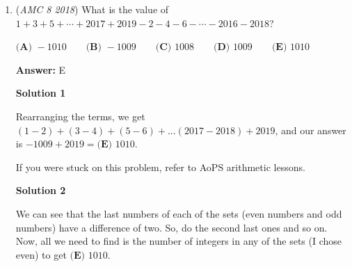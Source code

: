 \begin{enumerate}
 \textbf{Answer: }C



\textbf{Solution 1}

We count $3 \cdot 3=9$ unit squares in the middle, and $8$ small triangles, which gives 4 rectangles each with an area of $1$. Thus, the answer is $9+4=\boxed{\textbf{(C) } 13}$.

 



\textbf{Solution 2}

We can see here that there are $9$ total squares in the middle. We also see that the triangles that make the corners of the shape have an area half the squares' area. Then, we can easily find that each corner has an area of one square and there are $4$ corners so we add that to the original 9 squares to get $9+4=\boxed{\textbf{(C) } 13}$. That is how I did it. 

 



\textbf{Solution 3}

We can apply Pick's Theorem here. There are $8$ lattice points, and $12$ lattice points on the boundary. Then,

 
 \[8 + 12 \div 2 - 1 = \boxed {\textbf{(C) }13}.\]




\textbf{Solution 4}

Use the \href{https://artofproblemsolving.com/wiki/index.php?title=Shoelace\_Theorem}{Shoelace Theorem} and get $\boxed{\textbf{(C) } 13}$.

 


	\item (\textit{AMC 8 2018}) What is the value of $1+3+5+\cdots+2017+2019-2-4-6-\cdots-2016-2018$?


 $\textbf{(A) }-1010\qquad\textbf{(B) }-1009\qquad\textbf{(C) }1008\qquad\textbf{(D) }1009\qquad \textbf{(E) }1010$

 \textbf{Answer: }E



\textbf{Solution 1}

Rearranging the terms, we get $(1-2)+(3-4)+(5-6)+...(2017-2018)+2019$, and our answer is $-1009+2019=\boxed{\textbf{(E) }1010}$.

 If you were stuck on this problem, refer to AoPS arithmetic lessons.

 



\textbf{Solution 2}

We can see that the last numbers of each of the sets (even numbers and odd numbers) have a difference of two. So, do the second last ones and so on. Now, all we need to find is the number of integers in any of the sets (I chose even) to get $\boxed{\textbf{(E) }1010}$. 


\end{enumerate}

